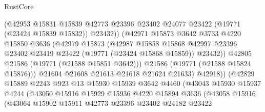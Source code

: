 \begin{lexlean}{RustCore}
\begin{coremodule}
                              (@42953
                                @15831
                                @15839
                                @42773
                                @23396
                                @23402
                                @24077
                                @23422
                                (@19771 (@23424 @15839 @15832))
                                @23432))
                            (@42971
                              @15873
                              @3642
                              @3733
                              @4220
                              @15850
                              @3636
                              (@42979
                                @15873
                                (@42987
                                  @15858
                                  @15868
                                  @42997
                                  @23396
                                  @23402
                                  @23419
                                  @23422
                                  (@19771 (@23424 @15868 @15859))
                                  @23432))
                              @42805
                              @21586
                              (@19771 (@21588 @15851 @3642)))
                            @21586
                            (@19771 (@21588 @15824 @15876)))
                          @21604
                          @21608
                          @21613
                          @21618
                          @21624
                          @21633)
                        @42918))
                    (@42829
                      @15889
                      @2243
                      @923
                      @13
                      @15930
                      @15939
                      @3642
                      @4460
                      (@43043
                        @15930
                        @15937
                        @4244
                        (@43050
                          @15916
                          @15929
                          @15936
                          @4220
                          @15894
                          @3636
                          (@43058
                            @15916
                            (@43064
                              @15902
                              @15911
                              @42773
                              @23396
                              @23402
                              @24182
                              @23422

\end{coremodule}
\end{lexlean}
